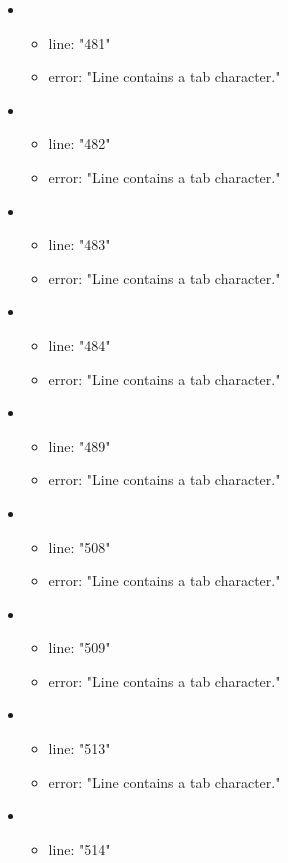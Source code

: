 \begin{itemize}
	\item 
	\begin{itemize} 
		\item line: "481" 
		\item error: "Line contains a tab character." 
	\end{itemize}
	\item 
	\begin{itemize} 
		\item line: "482" 
		\item error: "Line contains a tab character." 
	\end{itemize}
	\item 
	\begin{itemize} 
		\item line: "483" 
		\item error: "Line contains a tab character." 
	\end{itemize}
	\item 
	\begin{itemize} 
		\item line: "484" 
		\item error: "Line contains a tab character." 
	\end{itemize}
	\item 
	\begin{itemize} 
		\item line: "489" 
		\item error: "Line contains a tab character." 
	\end{itemize}
	\item 
	\begin{itemize} 
		\item line: "508" 
		\item error: "Line contains a tab character." 
	\end{itemize}
	\item 
	\begin{itemize} 
		\item line: "509" 
		\item error: "Line contains a tab character." 
	\end{itemize}
	\item 
	\begin{itemize} 
		\item line: "513" 
		\item error: "Line contains a tab character." 
	\end{itemize}
	\item 
	\begin{itemize} 
		\item line: "514" 

\end{itemize}
\end{itemize}
